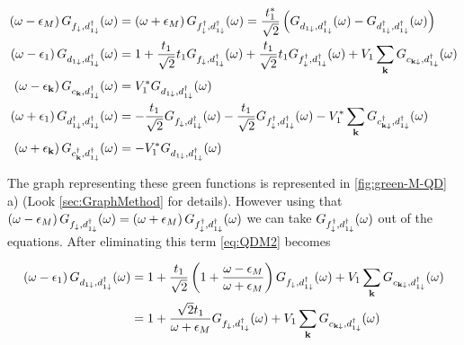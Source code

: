 \begin{align}
    \left(\omega-\epsilon_{M}\right)G_{f_{\downarrow},d_{1\downarrow}^{\dagger}}(\omega)&=\left(\omega+\epsilon_{M}\right)G_{f_{\downarrow}^{\dagger},d_{1\downarrow}^{\dagger}}(\omega)=\frac{t^*_1}{\sqrt{2}}\left(G_{d_{1\downarrow},d_{1\downarrow}^{\dagger}}(\omega)-G_{d_{1\downarrow}^{\dagger},d_{1\downarrow}^{\dagger}}(\omega)\right) \label{eq:QDM1} \\ 
    \left(\omega-\epsilon_{1}\right)G_{d_{1\downarrow},d_{1\downarrow}^{\dagger}}(\omega)&=1+\frac{t_1}{\sqrt{2}}t_{1}G_{f_{\downarrow},d_{1\downarrow}^{\dagger}}(\omega)+\frac{t_1}{\sqrt{2}}t_{1}G_{f_{\downarrow}^{\dagger},d_{1\downarrow}^{\dagger}}(\omega)+V_{1}\sum_{\mathbf{k}}G_{c_{\mathbf{k\downarrow}},d_{1\downarrow}^{\dagger}}(\omega) \label{eq:QDM2} \\ 
    \left(\omega-\epsilon_{\mathbf{k}}\right)G_{c_{\mathbf{k}},d_{1\downarrow}^{\dagger}}(\omega)&=V_{1}^{*}G_{d_{1\downarrow},d_{1\downarrow}^{\dagger}}(\omega)\label{eq:QDM3} \\
    \left(\omega+\epsilon_{1}\right)G_{d_{1\downarrow}^{\dagger},d_{1\downarrow}^{\dagger}}(\omega)&=-\frac{t_1}{\sqrt{2}}G_{f_{\downarrow},d_{1\downarrow}^{\dagger}}(\omega)-\frac{t_1}{\sqrt{2}}G_{f_{\downarrow}^{\dagger},d_{1\downarrow}^{\dagger}}(\omega)-V_{1}^{*}\sum_{\mathbf{k}}G_{c_{\mathbf{k\downarrow}}^{\dagger},d_{1\downarrow}^{\dagger}}(\omega) \label{eq:QDM4} \\
    \left(\omega+\epsilon_{\mathbf{k}}\right)G_{c^\dagger_{\mathbf{k}},d_{1\downarrow}^{\dagger}}(\omega)&=-V_{1}^{*}G_{d_{1\downarrow},d_{1\downarrow}^{\dagger}}(\omega) \label{eq:QDM5}
\end{align}

The graph representing these green functions is represented in \ref{fig:green-M-QD} a)  (Look \ref{sec:GraphMethod} for details). However using that $\left(\omega-\epsilon_{M}\right)G_{f_{\downarrow},d_{1\downarrow}^{\dagger}}(\omega)=\left(\omega+\epsilon_{M}\right)G_{f_{\downarrow}^{\dagger},d_{1\downarrow}^{\dagger}}(\omega)$ we can take
 $G_{f_{\downarrow}^{\dagger},d_{1\downarrow}^{\dagger}}(\omega)$ out of the equations. After eliminating this term \ref{eq:QDM2} becomes
 
 \begin{align}
\left(\omega-\epsilon_{1}\right)G_{d_{1\downarrow},d_{1\downarrow}^{\dagger}}(\omega)&=1+\frac{t_{1}}{\sqrt{2}}\left(1+\frac{\omega-\epsilon_{M}}{\omega+\epsilon_{M}}\right)G_{f_{\downarrow},d_{1\downarrow}^{\dagger}}(\omega)+V_{1}\sum_{\mathbf{k}}G_{c_{\mathbf{k\downarrow}},d_{1\downarrow}^{\dagger}}(\omega) \\
&=1+\frac{\sqrt{2}t_{1}}{\omega+\epsilon_{M}}G_{f_{\downarrow},d_{1\downarrow}^{\dagger}}(\omega)+V_{1}\sum_{\mathbf{k}}G_{c_{\mathbf{k\downarrow}},d_{1\downarrow}^{\dagger}}(\omega)
\end{align}

